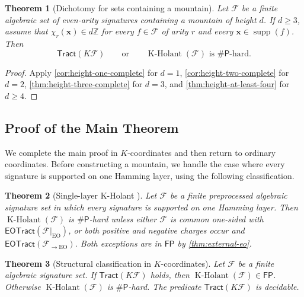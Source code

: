 \documentclass[11pt,letterpaper,onecolumn]{article}
\theoremstyle{plain}
\newtheorem{theorem}{Theorem}[section]
\theoremstyle{definition}
\theoremstyle{remark}
\newcommand{\cF}{\mathcal F}
\newcommand{\KHolant}{\operatorname{K\text{-}Holant}}
\newcommand{\EOTract}{\mathsf{EOTract}}
\newcommand{\Tract}{\mathsf{Tract}}
\newcommand{\FP}{\mathsf{FP}}
\newcommand{\SharpP}{\#\mathsf P}
\newcommand{\supp}{\operatorname{supp}}
\newcommand{\EO}{\mathrm{EO}}
\begin{document}
	\begin{theorem}[Dichotomy for sets containing a mountain]
		\label{thm:mountain-interface}
		Let \(\cF\) be a finite algebraic set of even-arity signatures containing a
		mountain of height \(d\).  If \(d\ge3\), assume that
		\(\chi_r({\mathbf x})\in d\mathbb Z\) for every \(f\in\cF\) of arity \(r\) and
        every \({\mathbf x}\in\supp(f)\). Then
		\[
		\Tract(K\cF)
		\qquad\text{or}\qquad
		\KHolant(\cF)\text{ is }\SharpP\text{-hard}.
		\]
	\end{theorem}
	
	\begin{proof}
		Apply \cref{cor:height-one-complete} for \(d=1\),
		\cref{cor:height-two-complete} for \(d=2\),
		\cref{thm:height-three-complete} for \(d=3\), and
		\cref{thm:height-at-least-four} for \(d\ge4\).
	\end{proof}
	
	\subsection{Proof of the Main Theorem}
	\label{sec:assembly}

	We complete the main proof in \(K\)-coordinates and then return to
	ordinary coordinates. Before constructing a mountain, we handle the case
	where every signature is supported on one Hamming layer, using the
	following classification.
	
	\begin{theorem}[Single-layer K-Holant
		{\cite[Corollary~68]{MengWangXia2025EO}}]
		\label{thm:external-single-weight}
		Let \(\cF\) be a finite preprocessed algebraic signature set in which every
		signature is supported on one Hamming layer.  Then \(\KHolant(\cF)\) is
		\(\SharpP\)-hard unless either \(\cF\) is common one-sided with
		\(\EOTract(\cF|_{\EO})\), or both positive and negative charges occur and
		\(\EOTract(\cF_{\to\EO})\).  Both exceptions are in \(\FP\) by
		\cref{thm:external-eo}.
	\end{theorem}
	
	
	
	\begin{theorem}[Structural classification in \(K\)-coordinates]
		\label{thm:K-structural}
		Let \(\cF\) be a finite algebraic signature set.  If
		\(\Tract(K\cF)\) holds, then \(\KHolant(\cF)\in\FP\). Otherwise
		\(\KHolant(\cF)\) is \(\SharpP\)-hard.  The predicate \(\Tract(K\cF)\) is decidable.
	\end{theorem}
	
\end{document}
